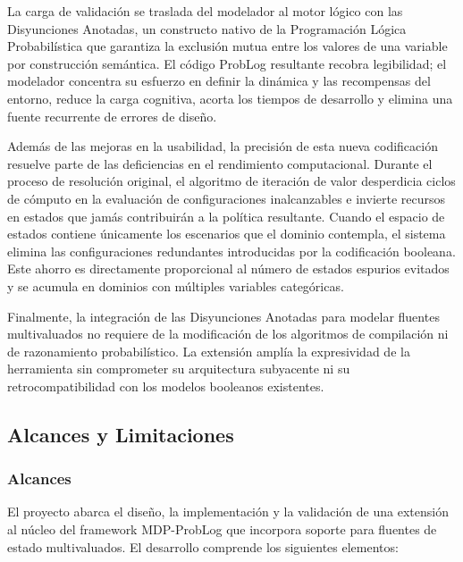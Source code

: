 La carga de validación se traslada del modelador al motor lógico con las Disyunciones Anotadas, un constructo nativo de la Programación Lógica Probabilística \cite{vennekens2004lpads} que garantiza la exclusión mutua entre los valores de una variable por construcción semántica. El código ProbLog resultante recobra legibilidad; el modelador concentra su esfuerzo en definir la dinámica y las recompensas del entorno, reduce la carga cognitiva, acorta los tiempos de desarrollo y elimina una fuente recurrente de errores de diseño.

Además de las mejoras en la usabilidad, la precisión de esta nueva codificación resuelve parte de las deficiencias en el rendimiento computacional. Durante el proceso de resolución original, el algoritmo de iteración de valor desperdicia ciclos de cómputo en la evaluación de configuraciones inalcanzables e invierte recursos en estados que jamás contribuirán a la política resultante. Cuando el espacio de estados contiene únicamente los escenarios que el dominio contempla, el sistema elimina las configuraciones redundantes introducidas por la codificación booleana. Este ahorro es directamente proporcional al número de estados espurios evitados y se acumula en dominios con múltiples variables categóricas.

Finalmente, la integración de las Disyunciones Anotadas para modelar fluentes multivaluados no requiere de la modificación de los algoritmos de compilación ni de razonamiento probabilístico. La extensión amplía la expresividad de la herramienta sin comprometer su arquitectura subyacente ni su retrocompatibilidad con los modelos booleanos existentes.


\clearpage

\subsection{Alcances y Limitaciones}
\label{sec:alcances_limitaciones}

\subsubsection{Alcances}
\label{subsec:alcances}

El proyecto abarca el diseño, la implementación y la validación de una
extensión al núcleo del framework MDP-ProbLog que incorpora soporte para
fluentes de estado multivaluados. El desarrollo comprende los siguientes
elementos:

